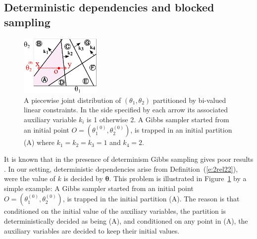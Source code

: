 \subsection{Deterministic dependencies and blocked sampling}
\label{sect:deterministic}
\begin{figure}
  \centering
  \includegraphics[width=0.35\textwidth]{pic/colxx.pdf}
\caption{\footnotesize
A piecewise joint distribution of $(\theta_1, \theta_2)$ partitioned by bi-valued linear constraints.
In the side specified by each arrow its associated auxiliary variable $k_i$ is 1 otherwise 2.
A Gibbs sampler started from an initial point $O = (\theta_1^{(0)}, \theta_2^{(0)})$, is trapped in an initial partition (A) 
where $k_1 = k_2 = k_3 = 1$ and $k_4 = 2$. 
}
\label{fig:simple.example}
\end{figure}
 It is known that in the presence of determinism Gibbs sampling gives poor results \cite{Poon:06}.
In our setting, deterministic dependencies arise from Definition~(\ref{e:2rel22}), were the value of $k$ is  decided by $\boldsymbol{\theta}$.
This problem is illustrated in Figure~\ref{fig:simple.example} by a simple example:
A Gibbs sampler started from an initial point $O=(\theta_1^{(0)}, \theta_2^{(0)})$, 
is trapped in the initial partition (A). 
The reason is that conditioned on the initial value of the auxiliary variables, the partition is deterministically decided as being (A), and conditioned on any point in (A), the auxiliary variables are decided to keep their initial values. %

